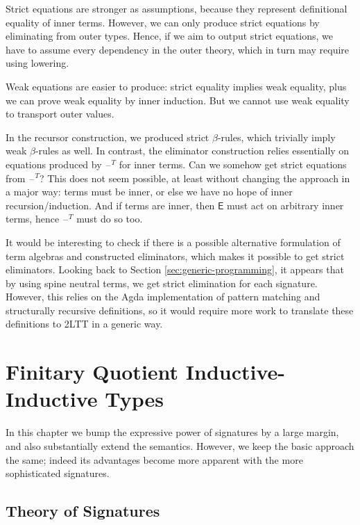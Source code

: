 \documentclass[12pt,a4paper,twoside,openany]{book}
\theoremstyle{remark}
\theoremstyle{definition}
\theoremstyle{theorem}
\newcommand{\ms}[1]{\mathsf{#1}}
\newcommand{\blank}{\mathord{\hspace{1pt}\text{--}\hspace{1pt}}}
\begin{document}
Strict equations are stronger as assumptions, because they represent
definitional equality of inner terms. However, we can only produce strict
equations by eliminating from outer types. Hence, if we aim to output strict
equations, we have to assume every dependency in the outer theory, which in turn
may require using lowering.

Weak equations are easier to produce: strict equality implies weak equality,
plus we can prove weak equality by inner induction. But we cannot use weak
equality to transport outer values.

In the recursor construction, we produced strict $\beta$-rules, which trivially
imply weak $\beta$-rules as well. In contrast, the eliminator construction
relies essentially on equations produced by $\blank^T$ for inner terms. Can we
somehow get strict equations from $\blank^T$? This does not seem possible, at
least without changing the approach in a major way: terms must be inner, or else
we have no hope of inner recursion/induction. And if terms are inner, then
$\ms{E}$ must act on arbitrary inner terms, hence $\blank^T$ must do so too.

It would be interesting to check if there is a possible alternative formulation of
term algebras and constructed eliminators, which makes it possible to get strict
eliminators. Looking back to Section \ref{sec:generic-programming}, it appears
that by using spine neutral terms, we get strict elimination for each
signature. However, this relies on the Agda implementation of pattern matching
and structurally recursive definitions, so it would require more work to translate
these definitions to 2LTT in a generic way.

\chapter{Finitary Quotient Inductive-Inductive Types}
\label{chap:fqiit}

In this chapter we bump the expressive power of signatures by a large margin,
and also substantially extend the semantics. However, we keep the basic approach
the same; indeed its advantages become more apparent with the more sophisticated
signatures.

\section{Theory of Signatures}
\label{sec:fqiit-tos}
\end{document}
